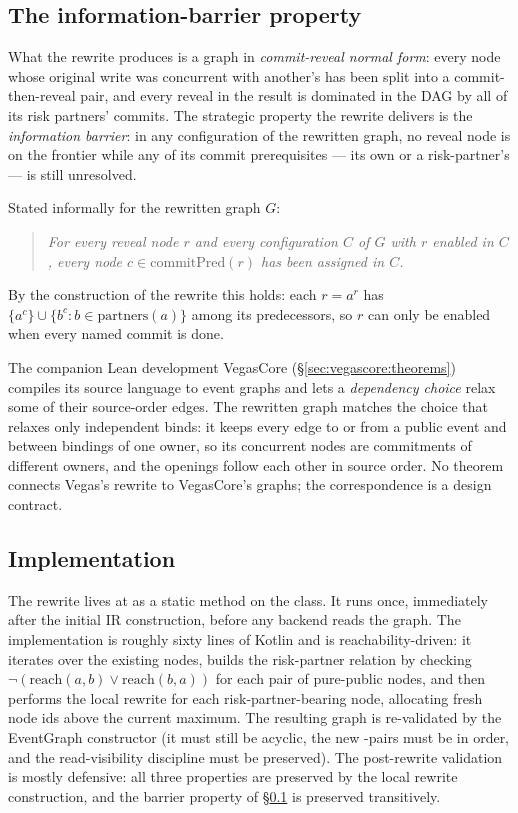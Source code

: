\subsection{The information-barrier property}
\label{sec:cr:barrier}

What the rewrite produces is a graph in \emph{commit-reveal
normal form}: every node whose original write was concurrent
with another's has been split into a commit-then-reveal pair,
and every reveal in the result is dominated in the DAG by all
of its risk partners' commits.  The strategic property the
rewrite delivers is the \emph{information barrier}: in any
configuration of the rewritten graph, no reveal node is on the
frontier while any of its commit prerequisites --- its own or a
risk-partner's --- is still unresolved.

Stated informally for the rewritten graph $G$:
\begin{quote}\itshape
For every reveal node $r$ and every configuration $C$ of $G$
with $r$ enabled in $C$, every node $c \in \mathrm{commitPred}(r)$
has been assigned in $C$.
\end{quote}
By the construction of the rewrite this holds: each
$r = a^r$ has $\{a^c\} \cup \{b^c : b \in \mathrm{partners}(a)\}$
among its predecessors, so $r$ can only be enabled when every
named commit is done.

The companion Lean development VegasCore
(\S\ref{sec:vegascore:theorems}) compiles its source language to
event graphs and lets a \emph{dependency choice} relax some of
their source-order edges.  The rewritten graph matches the choice that
relaxes only independent binds: it keeps every edge to or from a
public event and between bindings of one owner, so its concurrent
nodes are commitments of different owners, and the openings follow
each other in source order.  No theorem connects Vegas's rewrite to
VegasCore's graphs; the correspondence is a design contract.

\subsection{Implementation}

The rewrite lives at  as a static method
 on the  class.  It runs
once, immediately after the initial IR construction, before any
backend reads the graph.  The implementation is roughly sixty
lines of Kotlin and is reachability-driven: it iterates over the
existing nodes, builds the risk-partner relation by checking
$\neg(\mathrm{reach}(a,b) \vee \mathrm{reach}(b,a))$ for each
pair of pure-public nodes, and then performs the local rewrite
for each risk-partner-bearing node, allocating fresh node ids
above the current maximum.  The resulting graph is re-validated
by the EventGraph constructor (it must still be acyclic, the new
\COMMIT-\REVEAL pairs must be in order, and the read-visibility
discipline must be preserved).  The post-rewrite validation is
mostly defensive: all three properties are preserved by the
local rewrite construction, and the barrier property of
\S\ref{sec:cr:barrier} is preserved transitively.
